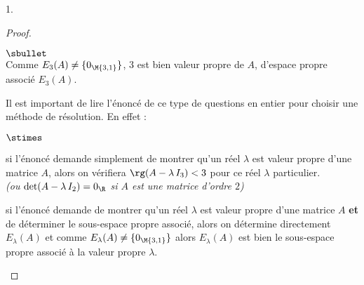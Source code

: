 \documentclass[11pt]{article}%
\begin{document}
\begin{noliste}{1.}
\begin{proof}
\begin{noliste}{$\sbullet$}
\[   \]  
   Comme $E_3(A) \neq \{0_{\M{3,1}}\}$, $3$ est bien valeur propre de
   $A$, d'espace propre associé $E_3(A)$.%
   \begin{remark}
     Il est important de lire l'énoncé de ce type de questions en entier 
     pour choisir une méthode de résolution. En effet :
     \begin{noliste}{$\stimes$}
     \item si l'énoncé demande simplement de montrer qu'un réel
       $\lambda$ est valeur propre d'une matrice $A$, alors on
       vérifiera $\rg(A-\lambda \, I_3) < 3$ pour ce réel $\lambda$
       particulier.\\
       \textit{(ou $\det(A-\lambda \, I_2)=0_{\R}$ si $A$ est une
         matrice d'ordre $2$)}
     \item si l'énoncé demande de montrer qu'un réel $\lambda$ est
       valeur propre d'une matrice $A$ {\bf et} de déterminer le
       sous-espace propre associé, alors on détermine directement
       $E_\lambda(A)$ et comme $E_\lambda(A) \neq \{0_{\M{3,1}}\}$
       alors $E_\lambda(A)$ est bien le sous-espace propre associé à
       la valeur propre $\lambda$.
     \end{noliste}
   \end{remark}
  

   \newpage



\end{noliste}
\end{proof}
\end{noliste}
\end{document}
